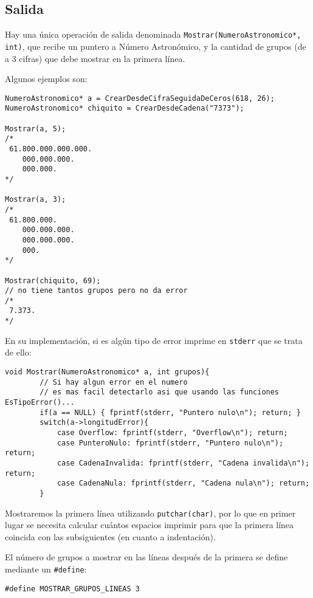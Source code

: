 \documentclass[a4paper, 12pt]{article}
\begin{document}
\subsection{Salida}\label{salida}
\bigbreak
Hay una única operación de salida denominada \verb|Mostrar(NumeroAstronomico*, int)|, que recibe un puntero a Número Astronómico, y la cantidad de grupos (de a 3 cifras) que debe mostrar en la primera línea.

Algunos ejemplos son:

\begin{lstlisting}[style=C]
NumeroAstronomico* a = CrearDesdeCifraSeguidaDeCeros(618, 26);
NumeroAstronomico* chiquito = CrearDesdeCadena("7373");

Mostrar(a, 5);
/*
 61.800.000.000.000.
    000.000.000.
    000.000.
*/

Mostrar(a, 3);
/*
 61.800.000.
    000.000.000.
    000.000.000.
    000.
*/

Mostrar(chiquito, 69);
// no tiene tantos grupos pero no da error
/*
 7.373.
*/
\end{lstlisting}

En su implementación, si es algún tipo de error imprime en \texttt{stderr} que se trata de ello:

\begin{lstlisting}[style=C]
    void Mostrar(NumeroAstronomico* a, int grupos){
        // Si hay algun error en el numero
        // es mas facil detectarlo asi que usando las funciones EsTipoError()...
        if(a == NULL) { fprintf(stderr, "Puntero nulo\n"); return; }
        switch(a->longitudError){
            case Overflow: fprintf(stderr, "Overflow\n"); return;
            case PunteroNulo: fprintf(stderr, "Puntero nulo\n"); return;
            case CadenaInvalida: fprintf(stderr, "Cadena invalida\n"); return;
            case CadenaNula: fprintf(stderr, "Cadena nula\n"); return;
        }
\end{lstlisting}

Mostraremos la primera línea utilizando \texttt{putchar(char)}, por lo que en primer lugar se necesita calcular cuántos espacios imprimir para que la primera línea coincida con las subsiguientes (en cuanto a indentación).

El número de grupos a mostrar en las líneas después de la primera se define mediante un \verb|#define|:

\begin{lstlisting}[style=C]
    #define MOSTRAR_GRUPOS_LINEAS 3
\end{lstlisting}
\end{document}
